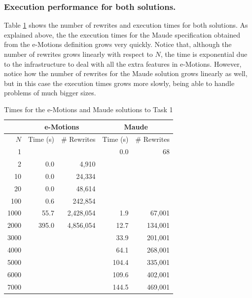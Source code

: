 \subsubsection{Execution performance for both solutions.}

Table \ref{table:task1} shows the number of rewrites and execution times for both solutions. As explained above, the the execution times for the Maude specification obtained from the e-Motions definition grows very quickly. Notice that, although the number of rewrites grows linearly with respect to $N$, the time is exponential due to the infrastructure to deal with all the extra features in e-Motions. However, notice how the number of rewrites for the Maude solution grows linearly as well, but in this case the execution times grows more slowly, being able to handle problems of much bigger sizes.

\begin{table}[tb]
\renewcommand{\tabcolsep}{6pt}
\renewcommand{\arraystretch}{1.2}
    \centering
	\begin{tabular}[tb]{r|r|r|r|r|}
	    & \multicolumn{2}{|c|}{e-Motions} & \multicolumn{2}{|c|}{Maude} \\
	\hline
	$N$ & Time (s) & \# Rewrites & Time (s) & \# Rewrites \\
	\hline
	1    &       &           & 0.0 &       68 \\
	2    &   0.0 &     4,910 && \\
	10   &   0.0 &    24,334 && \\
	20   &   0.0 &    48,614 && \\
	100  &   0.6 &   242,854 && \\
	1000 &  55.7 & 2,428,054 &   1.9 &  67,001 \\
	2000 & 395.0 & 4,856,054 &  12.7 & 134,001 \\
	3000 &       &           &  33.9 & 201,001 \\
	4000 &       &           &  64.1 & 268,001 \\
	5000 &       &           & 104.4 & 335,001 \\
	6000 &       &           & 109.6 & 402,001 \\
	7000 &       &           & 144.5 & 469,001 \\
	\end{tabular}
	\vspace{.5cm}
	\caption{Times for the e-Motions and Maude solutions to Task 1}
	\label{table:task1}
\end{table}

